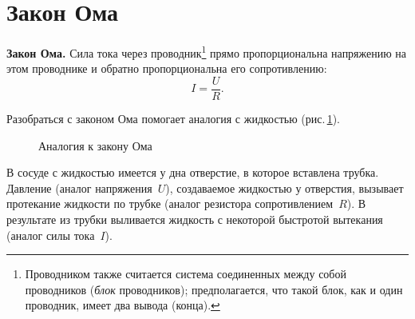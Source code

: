 \documentclass[main.tex]{subfiles}
\begin{document}

 

 

 
   

\section{Закон Ома}



\begin{law}
    \textbf{Закон Ома.} Сила тока через проводник\footnote{Проводником также считается система соединенных между собой проводников (\emph{блок} проводников); предполагается, что такой блок, как и один проводник, имеет два вывода (конца).} прямо пропорциональна напряжению на этом проводнике и обратно пропорциональна его сопротивлению:
    \begin{equation}
        I=\frac{U}{R}.
    \end{equation}
\end{law}
%
Разобраться с законом Ома помогает аналогия с жидкостью (рис.\,\ref{fig:p122}).

\begin{figure}[H]
    \centering

\caption{Аналогия к закону Ома}
\label{fig:p122}
\end{figure}

В сосуде с жидкостью имеется у дна отверстие, в которое вставлена трубка. Давление (аналог напряжения~$U$), создаваемое жидкостью у отверстия, вызывает протекание жидкости по трубке (аналог резистора сопротивлением~$R$). В результате из трубки выливается жидкость с некоторой быстротой вытекания (аналог силы тока~$I$). 
\end{document}
